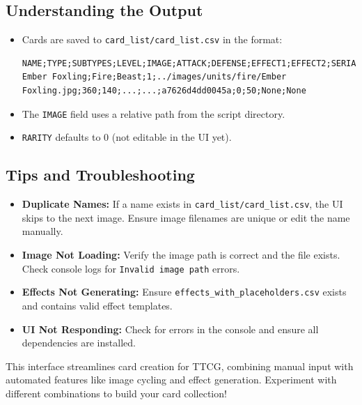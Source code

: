 \subsection{Understanding the Output}

\begin{itemize}
    \item Cards are saved to \texttt{card\_list/card\_list.csv} in the format:
\begin{lstlisting}
NAME;TYPE;SUBTYPES;LEVEL;IMAGE;ATTACK;DEFENSE;EFFECT1;EFFECT2;SERIAL;RARITY;TRANSLUCENCY;EFFECT1_STYLE;EFFECT2_STYLE
Ember Foxling;Fire;Beast;1;../images/units/fire/Ember Foxling.jpg;360;140;...;...;a7626d4dd0045a;0;50;None;None
\end{lstlisting}
    \item The \texttt{IMAGE} field uses a relative path from the script directory.
    \item \texttt{RARITY} defaults to 0 (not editable in the UI yet).
\end{itemize}

\subsection{Tips and Troubleshooting}

\begin{itemize}
    \item \textbf{Duplicate Names:} If a name exists in \texttt{card\_list/card\_list.csv}, the UI skips to the next image. Ensure image filenames are unique or edit the name manually.
    \item \textbf{Image Not Loading:} Verify the image path is correct and the file exists. Check console logs for \texttt{Invalid image path} errors.
    \item \textbf{Effects Not Generating:} Ensure \texttt{effects\_with\_placeholders.csv} exists and contains valid effect templates.
    \item \textbf{UI Not Responding:} Check for errors in the console and ensure all dependencies are installed.
\end{itemize}

This interface streamlines card creation for TTCG, combining manual input with automated features like image cycling and effect generation. Experiment with different combinations to build your card collection!
